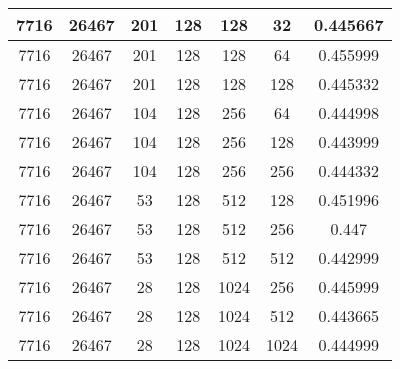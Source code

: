 \documentclass[9pt]{article}
\begin{document}
\begin{tabular}{|c|c|c|c|c|c|c| }
\hline
7716  & 26467  & 201  & 128  & 128  & 32  & 0.445667 \\
\hline
7716  & 26467  & 201  & 128  & 128  & 64  & 0.455999 \\
\hline
7716  & 26467  & 201  & 128  & 128  & 128  & 0.445332 \\
\hline
7716  & 26467  & 104  & 128  & 256  & 64  & 0.444998 \\
\hline
7716  & 26467  & 104  & 128  & 256  & 128  & 0.443999 \\
\hline
7716  & 26467  & 104  & 128  & 256  & 256  & 0.444332 \\
\hline
7716  & 26467  & 53  & 128  & 512  & 128  & 0.451996 \\
\hline
7716  & 26467  & 53  & 128  & 512  & 256  & 0.447 \\
\hline
7716  & 26467  & 53  & 128  & 512  & 512  & 0.442999 \\
\hline
7716  & 26467  & 28  & 128  & 1024  & 256  & 0.445999 \\
\hline
7716  & 26467  & 28  & 128  & 1024  & 512  & 0.443665 \\
\hline
7716  & 26467  & 28  & 128  & 1024  & 1024  & 0.444999 \\
\hline
\end{tabular}
 
\end{document}
